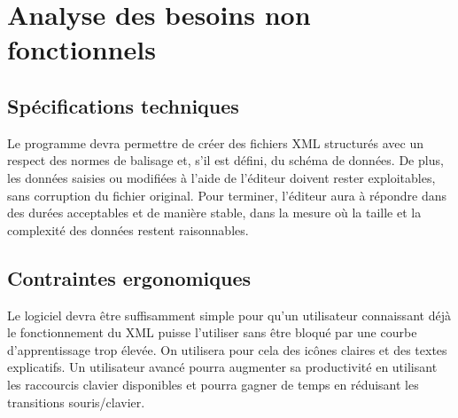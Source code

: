 	\section{Analyse des besoins non fonctionnels}
		\subsection{Spécifications techniques}
		Le programme devra permettre de créer des fichiers XML structurés avec un respect des normes de balisage et, s'il est défini, du schéma de données. De plus, les données saisies ou modifiées à l'aide de l'éditeur doivent rester exploitables, sans corruption du fichier original. Pour terminer, l'éditeur aura à répondre dans des durées acceptables et de manière stable, dans la mesure où la taille et la complexité des données restent raisonnables.
		
		\subsection{Contraintes ergonomiques}
                Le logiciel devra être suffisamment simple pour qu'un utilisateur connaissant déjà le fonctionnement du XML puisse l'utiliser sans être bloqué par une courbe d'apprentissage trop élevée. On utilisera pour cela des icônes claires et des textes explicatifs.
                Un utilisateur avancé pourra augmenter sa productivité en utilisant les raccourcis clavier disponibles et pourra gagner de temps en réduisant les transitions souris/clavier.
